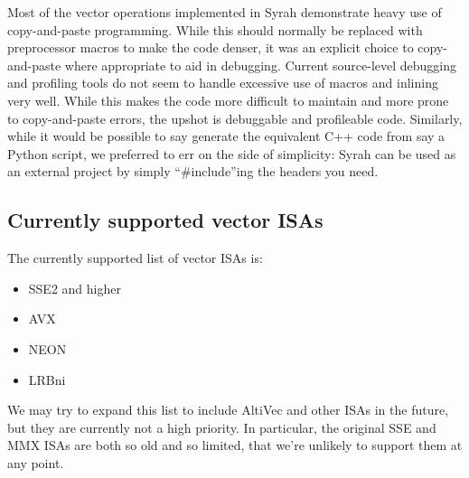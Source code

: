 \documentclass[11pt]{amsart}
\begin{document}
Most of the vector operations implemented in Syrah demonstrate heavy
use of copy-and-paste programming. While this should normally be
replaced with preprocessor macros to make the code denser, it was an
explicit choice to copy-and-paste where appropriate to aid in
debugging. Current source-level debugging and profiling tools do not
seem to handle excessive use of macros and inlining very well. While
this makes the code more difficult to maintain and more prone to
copy-and-paste errors, the upshot is debuggable and profileable
code. Similarly, while it would be possible to say generate the
equivalent C++ code from say a Python script, we preferred to err on
the side of simplicity: Syrah can be used as an external project by
simply ``\#include''ing the headers you need.

\subsection{Currently supported vector ISAs}

The currently supported list of vector ISAs is:

\begin{itemize}
\item SSE2 and higher
\item AVX
\item NEON
\item LRBni
\end{itemize}

We may try to expand this list to include AltiVec and other ISAs in
the future, but they are currently not a high priority. In particular,
the original SSE and MMX ISAs are both so old and so limited, that
we're unlikely to support them at any point.
\end{document}
